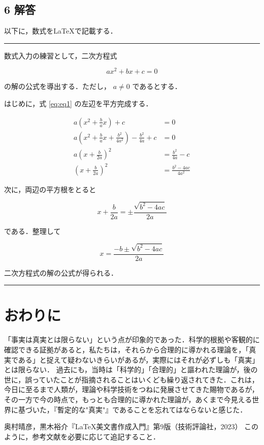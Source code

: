 \documentclass[11pt, a4paper]{jsarticle}
\begin{document}
\subsection*{6 解答}

以下に，数式を\LaTeX で記載する．

\rule{\linewidth}{0.1mm}

数式入力の練習として，二次方程式

\begin{equation}
    ax^2 + bx + c = 0
    \label{eq:eq1}
\end{equation}

の解の公式を導出する．ただし， $a \neq 0$ であるとする．

はじめに，式 \ref{eq:eq1} の左辺を平方完成する．

\begin{equation}
    \begin{aligned}
    a\left(x^2+\frac{b}{a} x\right)+c & =0 \\
    a\left(x^2+\frac{b}{a} x+\frac{b^2}{4 a^2}\right)-\frac{b^2}{4 a}+c & =0 \\
    a\left(x+\frac{b}{2 a}\right)^2 & =\frac{b^2}{4 a}-c \\
    \left(x+\frac{b}{2 a}\right)^2 & =\frac{b^2-4 a c}{4 a^2}
    \end{aligned}
\end{equation}

次に，両辺の平方根をとると

\begin{equation}
    x+\frac{b}{2 a}= \pm \frac{\sqrt{b^2-4 a c}}{2 a}
\end{equation}

である．整理して

\begin{equation}
    x=\frac{-b \pm \sqrt{b^2-4 a c}}{2 a}
\end{equation}

二次方程式の解の公式が得られる．

\rule{\linewidth}{0.1mm}

\section*{おわりに}

「事実は真実とは限らない」という点が印象的であった．科学的根拠や客観的に確認できる証拠があると，私たちは，それらから合理的に導かれる理論を，「真実である」と捉えて疑わないきらいがあるが，実際にはそれが必ずしも「真実」とは限らない．
過去にも，当時は「科学的」「合理的」と謳われた理論が，後の世に，誤っていたことが指摘されることはいくども繰り返されてきた．これは，今日に至るまで人類が，理論や科学技術をつねに発展させてきた賜物であるが，その一方で今の時点で，もっとも合理的に導かれた理論が，あくまで今見える世界に基づいた，『暫定的な"真実"』であることを忘れてはならないと感じた．


 
\begin{thebibliography}{99}
     奥村晴彦，黒木裕介『\LaTeX 美文書作成入門』第9版（技術評論社，2023）
     このように，参考文献を必要に応じて追記すること．
\end{thebibliography}
\end{document}
